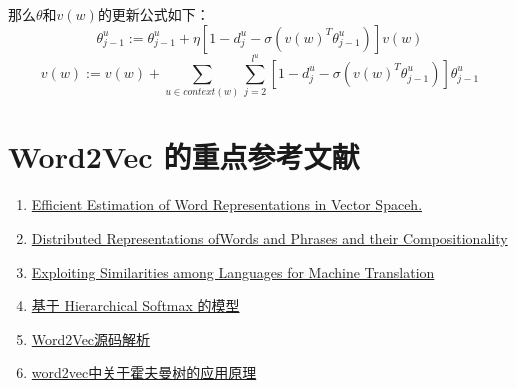     那么$\theta$和$v(w)$的更新公式如下：
    \begin{equation}
        \theta_{j-1}^{u} :=\theta_{j-1}^{u}+\eta [1-d_j^u-\sigma(v(w)^T\theta_{j-1}^{u})] v(w)
    \end{equation}
    \begin{equation}
        v(w):=v(w)+\sum_{u \in context(w)} \sum_{j=2}^{l^u}[1-d_j^u-\sigma(v(w)^T\theta_{j-1}^{u})] \theta_{j-1}^{u}
    \end{equation}


    \section{Word2Vec 的重点参考文献}
    \begin{enumerate}
        \item \href{http://arxiv.org/pdf/1301.3781v3.pdf}{Efficient Estimation of Word Representations in Vector Spaceh. }
        \item \href{https://papers.nips.cc/paper/5021-distributed-representations-of-words-and-phrases-and-their-compositionality.pdf}{Distributed Representations ofWords and Phrases and their Compositionality}
        \item \href{http://static.googleusercontent.com/media/research.google.com/zh-CN//pubs/archive/44931.pdf}{Exploiting Similarities among Languages for Machine Translation }
        \item \href{http://blog.csdn.net/itplus/article/details/37969979}{基于 Hierarchical Softmax 的模型}
        \item \href{http://www.cnblogs.com/neopenx/p/4571996.html}{Word2Vec源码解析}
        \item \href{http://blog.csdn.net/zhoubl668/article/details/24319529}{word2vec中关于霍夫曼树的应用原理}
    \end{enumerate}



